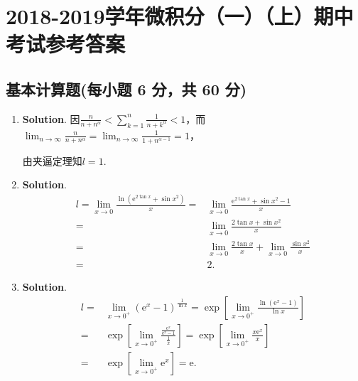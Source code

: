 \documentclass[../main.tex]{subfiles}
\begin{document}
\chapter{2018-2019学年微积分（一）（上）期中考试参考答案}
\section{基本计算题(每小题 6 分，共 60 分)}
\begin{enumerate}
    \item \textbf{Solution}. 因$\frac{n}{n+n^{\alpha}}<\sum_{k=1}^{n}\frac{1}{n+k^{\alpha}}
              <1$，而$\lim_{n\to\infty}\frac{n}{n+n^{\alpha}}=\lim_{n\to\infty}\frac{1}{1+n^{\alpha-1}}
              =1$，

          由夹逼定理知$l=1$.

    \item \textbf{Solution}.
          \[
              \begin{aligned}
                  l=\lim_{x\to0}\frac{\ln\left(\mathrm{e}^{2\tan x}+\sin x^2\right)}{x}= {} & \lim_{x\to0}\frac{\mathrm{e}^{2\tan x}+\sin x^2-1}{x}        \\
                  = {}                                                                      & \lim_{x\to0}\frac{2\tan x+\sin x^2}{x}                       \\
                  = {}                                                                      & \lim_{x\to0}\frac{2\tan x}{x}+\lim_{x\to0}\frac{\sin x^2}{x} \\
                  = {}                                                                      & 2.
              \end{aligned}
          \]

    \item \textbf{Solution}.
          \[
              \begin{aligned}
                  l= {} & \lim_{x\to0^+}\left(\mathrm{e}^{x}-1\right)^{\frac{1}{\ln x}}= \exp\left[{\lim\limits_{x\to0^+}\frac{\ln\left(\mathrm{e}^x-1\right)}{\ln x}}\right]              \\
                  = {}  & \exp\left[{\lim\limits_{x\to0^+}\frac{\frac{\mathrm{e}^x}{\mathrm{e}^x-1}}{\frac{1}{x}}}\right]= \exp\left[{\lim\limits_{x\to0^+}\frac{x\mathrm{e}^x}{x}}\right] \\
                  = {}  & \exp\left[{\lim\limits_{x\to0^+}\mathrm{e}^x}\right]= \mathrm{e}.
              \end{aligned}
          \]


\end{enumerate}
\end{document}
